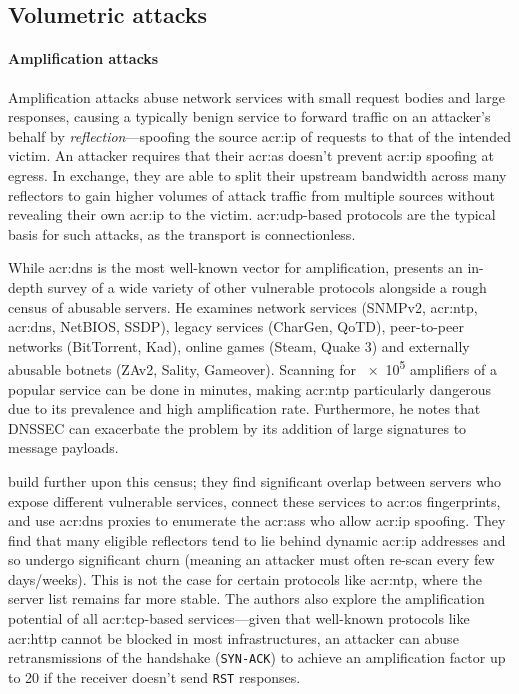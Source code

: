 \subsection{Volumetric attacks}

\paragraph{Amplification attacks}
Amplification attacks abuse network services with small request bodies and large responses, causing a typically benign service to forward traffic on an attacker's behalf by \emph{reflection}---spoofing the source \gls{acr:ip} of requests to that of the intended victim.
An attacker requires that their \gls{acr:as} doesn't prevent \gls{acr:ip} spoofing at egress.
In exchange, they are able to split their upstream bandwidth across many reflectors to gain higher volumes of attack traffic from multiple sources without revealing their own \gls{acr:ip} to the victim.
\gls{acr:udp}-based protocols are the typical basis for such attacks, as the transport is connectionless.

While \gls{acr:dns} is the most well-known vector for amplification, \textcite{DBLP:conf/ndss/Rossow14} presents an in-depth survey of a wide variety of other vulnerable protocols alongside a rough census of abusable servers.
He examines network services (SNMPv2, \gls{acr:ntp}, \gls{acr:dns}, NetBIOS, SSDP), legacy services (CharGen, QoTD), peer-to-peer networks (BitTorrent, Kad), online games (Steam, Quake 3) and externally abusable botnets (ZAv2, Sality, Gameover).
Scanning for \num{e5} amplifiers of a popular service can be done in minutes, making \gls{acr:ntp} particularly dangerous due to its prevalence and high amplification rate.
Furthermore, he notes that DNSSEC can exacerbate the problem by its addition of large signatures to message payloads.

\textcite{DBLP:conf/uss/KuhrerHRH14} build further upon this census; they find significant overlap between servers who expose different vulnerable services, connect these services to \gls{acr:os} fingerprints, and use \gls{acr:dns} proxies to enumerate the \glspl{acr:as} who allow \gls{acr:ip} spoofing.
They find that many eligible reflectors tend to lie behind dynamic \gls{acr:ip} addresses and so undergo significant churn (meaning an attacker must often re-scan every few days/weeks).
This is not the case for certain protocols like \gls{acr:ntp}, where the server list remains far more stable.
The authors also explore the amplification potential of all \gls{acr:tcp}-based services---given that well-known protocols like \gls{acr:http} cannot be blocked in most infrastructures, an attacker can abuse retransmissions of the handshake (\texttt{SYN-ACK}) to achieve an amplification factor up to \qty{20}{\times} if the receiver doesn't send \texttt{RST} responses.


